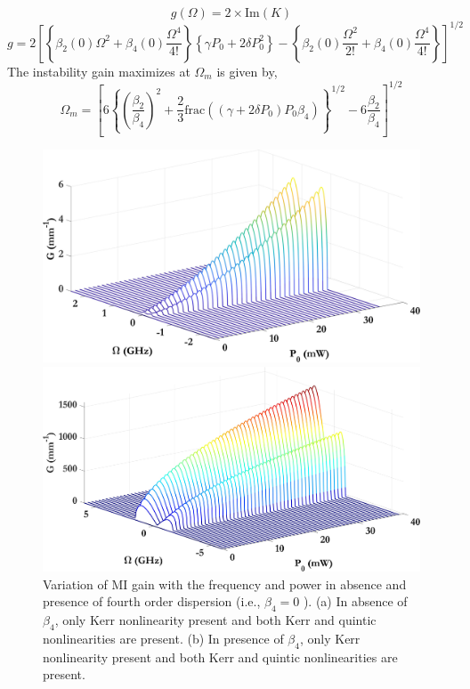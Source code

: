 \documentclass[12pt,a4paper]{article}
\begin{document}
\begin{equation}
g(\Omega) = 2 \times \text{Im}(K)
\tag{48}
\end{equation}
\begin{equation}
g = 2 \left[ \left\{ \beta_2(0) \Omega^2 + \beta_4(0) \frac{\Omega^4}{4!} \right\} \left\{ \gamma P_0 + 2 \delta P_0^2 \right\} - \left\{ \beta_2(0) \frac{\Omega^2}{2!} + \beta_4(0) \frac{\Omega^4}{4!} \right\} \right]^{1/2}
\tag{49}
\end{equation}
The instability gain maximizes at $\Omega_m$ is given by,
\begin{equation}
\Omega_m = \left[ 6 \left\{ \left( \frac{\beta_2}{\beta_4} \right)^2 + \frac{2}{3} \text{frac} \left( (\gamma + 2\delta P_0) P_0 \beta_4 \right) \right\}^{1/2} - 6 \frac{\beta_2}{\beta_4} \right]^{1/2}
\tag{50}
\end{equation}

\begin{figure}[h]
  \centering
  \begin{minipage}{0.48\textwidth}
    \centering
    \includegraphics[width=\linewidth]{Plots/Beta2_Kerr.jpeg}
    \subcaption{}
  \end{minipage}%
  \hfill
  \begin{minipage}{0.48\textwidth}
    \centering
    \includegraphics[width=\linewidth]{Plots/Beta4_Kerr.jpeg}
    \subcaption{}
  \end{minipage}
  \caption{Variation of MI gain with the frequency and power in absence and presence of fourth order dispersion (i.e., \(\beta_4=0\) ). (a) In absence of \(\beta_4\), only Kerr nonlinearity present and both Kerr and quintic nonlinearities are present. (b) In presence of \(\beta_4\), only Kerr nonlinearity present and both Kerr and quintic nonlinearities are present.}
  \label{fig:omegac}
\end{figure}
\end{document}
